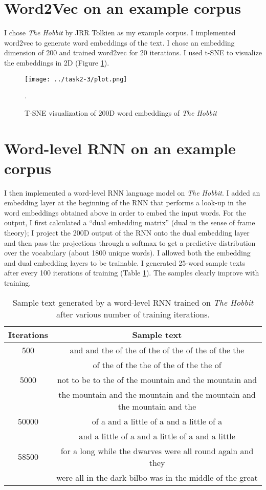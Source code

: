 \documentclass[11pt]{article}
\begin{document}
\section{Word2Vec on an example corpus}

I chose \textit{The Hobbit} by JRR Tolkien as my example corpus. I implemented word2vec to generate word embeddings of the text. I chose an embedding dimension of 200 and trained word2vec for 20 iterations. I used t-SNE to visualize the embeddings in 2D (Figure \ref{fig-tsne2}).

\begin{figure}
\centering
\texttt{[image: ../task2-3/plot.png]}
\caption{\label{fig-tsne2} T-SNE visualization of 200D word embeddings of \textit{The Hobbit}}.
\end{figure}

\section{Word-level RNN on an example corpus}

I then implemented a word-level RNN language model on \textit{The Hobbit}. I added an embedding layer at the beginning of the RNN that performs a look-up in the word embeddings obtained above in order to embed the input words. For the output, I first calculated a ``dual embedding matrix'' (dual in the sense of frame theory); I project the 200D output of the RNN onto the dual embedding layer and then pass the projections through a softmax to get a predictive distribution over the vocabulary (about 1800 unique words). I allowed both the embedding and dual embedding layers to be trainable. I generated 25-word sample texts after every 100 iterations of training (Table \ref{table-sample2}). The samples clearly improve with training.

\begin{table}
\centering
\caption{\label{table-sample2} Sample text generated by a word-level RNN trained on \textit{The Hobbit} after various number of training iterations.}
\begin{tabular}{|c|c|} \hline
Iterations & Sample text \\ \hline
500 & and and the of the of the of the of the of the the \\
\quad & of the of the the of the of the the of  \\ \hline
5000 & not to be to the of the mountain and the mountain and \\
\quad & the mountain and the mountain and the mountain and the mountain and the \\ \hline
50000 & of a and a little of a and a little of a \\
\quad & and a little of a and a little of a and a little \\ \hline
58500 & for a long while the dwarves were all round again and they \\
\quad & were all in the dark bilbo was in the middle of the great \\
\hline
\end{tabular}
\end{table}
\end{document}
